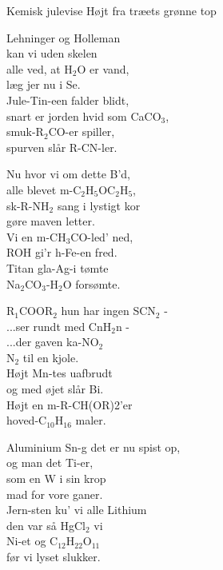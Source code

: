 \begin{song}{Kemisk julevise}
  {} %
  {Højt fra træets grønne top} %
  {} %
  {} %
  {\NotCCLIed} %

  \begin{SBVerse}
Lehninger og Holleman\\
kan vi uden skelen\\
alle ved, at H$_2$O er vand,\\
læg jer nu i Se.\\
Jule-Tin-een falder blidt,\\
snart er jorden hvid som CaCO$_3$,\\
smuk-R$_2$CO-er spiller,\\
spurven slår R-CN-ler.
  \end{SBVerse}

  \begin{SBVerse}
Nu hvor vi om dette B'd,\\
alle blevet m-C$_2$H$_5$OC$_2$H$_5$,\\
sk-R-NH$_2$ sang i lystigt kor\\
gøre maven letter.\\
Vi en m-CH$_3$CO-led' ned,\\
ROH gi'r h-Fe-en fred.\\
Titan gla-Ag-i tømte\\
Na$_2$CO$_3$-H$_2$O forsømte.
  \end{SBVerse}

  \begin{SBVerse}
R$_1$COOR$_2$ hun har ingen SCN$_2$ -\\
...ser rundt med CnH$_2$n -\\
...der gaven ka-NO$_2$\\
N$_2$ til en kjole.\\
Højt Mn-tes uafbrudt\\
og med øjet slår Bi.\\
Højt en m-R-CH(OR)2'er\\
hoved-C$_{10}$H$_{16}$ maler.
  \end{SBVerse}

  \begin{SBVerse}
Aluminium Sn-g det er nu spist op,\\
og man det Ti-er,\\
som en W i sin krop\\
mad for vore ganer.\\
Jern-sten ku' vi alle Lithium\\
den var så HgCl$_2$ vi\\
Ni-et og C$_{12}$H$_{22}$O$_{11}$\\
før vi lyset slukker.
  \end{SBVerse}
\end{song}